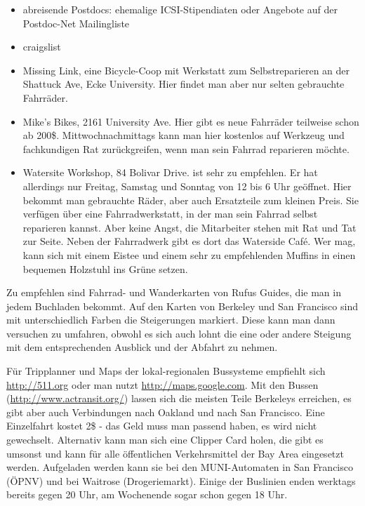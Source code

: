 \documentclass[a4paper]{scrreprt}
\begin{document}
\begin{itemize}
\item abreisende Postdocs: ehemalige ICSI-Stipendiaten oder Angebote
  auf der Postdoc-Net Mailingliste
\item craigslist
\item Missing Link, eine Bicycle-Coop mit Werkstatt zum
  Selbstreparieren an der Shattuck Ave, Ecke University. Hier findet man
  aber nur selten gebrauchte Fahrräder.
\item Mike's Bikes, 2161 University Ave. Hier gibt es neue Fahrräder
  teilweise schon ab 200\$. Mittwochnachmittags kann man hier kostenlos
  auf Werkzeug und fachkundigen Rat zurückgreifen, wenn man sein
  Fahrrad reparieren möchte.
\item Watersite Workshop, 84 Bolivar Drive. ist sehr zu
  empfehlen. Er hat allerdings nur Freitag, Samstag und Sonntag von 12
  bis 6 Uhr geöffnet. Hier bekommt man gebrauchte Räder, aber auch Ersatzteile
  zum kleinen Preis. Sie verfügen über eine Fahrradwerkstatt, in der
  man sein Fahrrad selbst reparieren kannst. Aber keine Angst, die Mitarbeiter
  stehen mit Rat und Tat zur Seite. Neben der Fahrradwerk gibt es dort
  das Waterside Café. Wer mag, kann sich mit einem Eistee und einem
  sehr zu  empfehlenden Muffins in einen bequemen Holzstuhl ins Grüne
  setzen.
\end{itemize}

Zu empfehlen sind Fahrrad- und Wanderkarten von Rufus Guides, die man
in jedem Buchladen bekommt. Auf den Karten von Berkeley und San
Francisco sind mit unterschiedlich Farben die Steigerungen
markiert. Diese kann man dann versuchen zu umfahren, obwohl es sich
auch lohnt die eine oder andere Steigung mit dem entsprechenden
Ausblick und der Abfahrt zu nehmen. 

Für Tripplanner und Maps der lokal-regionalen Bussysteme empfiehlt
sich \url{http://511.org} oder man nutzt
\url{http://maps.google.com}. Mit den Bussen
(\url{http://www.actransit.org/}) lassen sich die meisten Teile
Berkeleys erreichen, es gibt aber auch Verbindungen nach Oakland und
nach San Francisco. Eine Einzelfahrt kostet 2\$ - das Geld muss man
passend haben, es wird nicht gewechselt. Alternativ kann man sich eine
Clipper Card holen, die gibt es umsonst und kann für alle öffentlichen
Verkehrsmittel der Bay Area eingesetzt werden. Aufgeladen werden kann
sie bei den MUNI-Automaten in San Francisco (ÖPNV) und bei Waitrose
(Drogeriemarkt). Einige der Buslinien enden werktags bereits gegen 20
Uhr, am Wochenende sogar schon gegen 18 Uhr.
\end{document}
